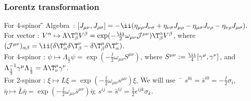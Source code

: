 \subsubsection{Lorentz transformation}
\begin{tabbing}
 For 4-spinor \=\hspace{1em}\=\hspace{14em}\=\kill
 Algebra~\>:\>
 $\displaystyle
  [J_{\mu\nu},J_{\rho\sigma}] = -\ii(\Hmrd J_{\nu\sigma} + \Hnsd J_{\mu\rho} - \Hmsd J_{\nu\rho} - \Hnrd J_{\mu\sigma}).$\\
 For vector \>:\> $V^\alpha\mapsto\Lambda\T^\alpha_\beta V^\beta=\exp(-\frac\ii2\omega_{\mu\nu}{\mathcal J^{\mu\nu}})\T^\alpha_\beta V^\beta$, where $(\mathcal J^{\mu\nu})_{\alpha\beta}=\ii(\delta\T^\mu_\alpha\delta\T^\nu_\beta-\delta\T^\mu_\beta\delta\T^\nu_\alpha)$.\\
 For 4-spinor \>:\> $\psi\mapsto \Lambda_{\frac12}\psi=\exp(-\frac\ii2\omega_{\mu\nu}S^{\mu\nu})$, where $S^{\mu\nu}:=\frac\ii4[\Gm,\Gn]$, and $\Lambda^{-1}_{\frac12}\Gm\Lambda_{\frac12}=\Lambda\T^\mu_\nu\Gn$.~\footnotemark\\
 For 2-spinor \>:\> $\xi\mapsto L\xi = \exp(-\frac\ii2\omega_{\mu\nu}s^{\mu\nu})\xi$, \> We will use~~\= $s^{0i}=\bar s^{i0}=-\frac\ii2\sigma_i$,\\
\>\>$\bar\eta\mapsto\bar L\bar\eta = \exp(-\frac\ii2\omega_{\mu\nu}\bar s^{\mu\nu})\bar\eta$; \> \> $s^{ij}=\bar s^{ij}=\frac12\epsilon^{ijk}\sigma_k$.
\end{tabbing}

\vspace{-2em}

